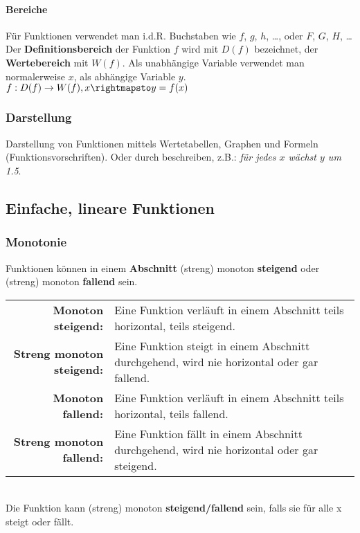 \paragraph{Bereiche}Für Funktionen verwendet man i.d.R. Buchstaben wie $f$, $g$, $h$, \dots, oder $F$, $G$, $H$, \dots Der \textbf{Definitionsbereich} der Funktion $f$ wird mit $D(f)$ bezeichnet, der \textbf{Wertebereich} mit $W(f)$. Als unabhängige Variable verwendet man normalerweise $x$, als abhängige Variable $y$.\\[1em]
$f: D(f)\rightarrow W(f),x\rightmapsto y=f(x)$\\[1em]


\subsubsection{Darstellung}Darstellung von Funktionen mittels Wertetabellen, Graphen und Formeln (Funktionsvorschriften). Oder durch beschreiben, z.B.: \textsl{für jedes $x$ wächst $y$ um 1.5}.

\subsection{Einfache, lineare Funktionen}
\subsubsection{Monotonie}Funktionen können in einem \textbf{Abschnitt} (streng) monoton \textbf{steigend} oder (streng) monoton \textbf{fallend} sein. \\[1em]
\begin{tabularx}{\textwidth}{|rX|}
    \hline
    \textbf{Monoton steigend:}&Eine Funktion verläuft in einem Abschnitt teils horizontal, teils steigend.\\
    \textbf{Streng monoton steigend:}&Eine Funktion steigt in einem Abschnitt durchgehend, wird nie horizontal oder gar fallend.\\
    \textbf{Monoton fallend:}&Eine Funktion verläuft in einem Abschnitt teils horizontal, teils fallend.\\
    \textbf{Streng monoton fallend:}&Eine Funktion fällt in einem Abschnitt durchgehend, wird nie horizontal oder gar steigend.\\
    \hline
\end{tabularx}\\[1em]
Die Funktion kann (streng) monoton \textbf{steigend/fallend} sein, falls sie für alle x steigt oder fällt.

